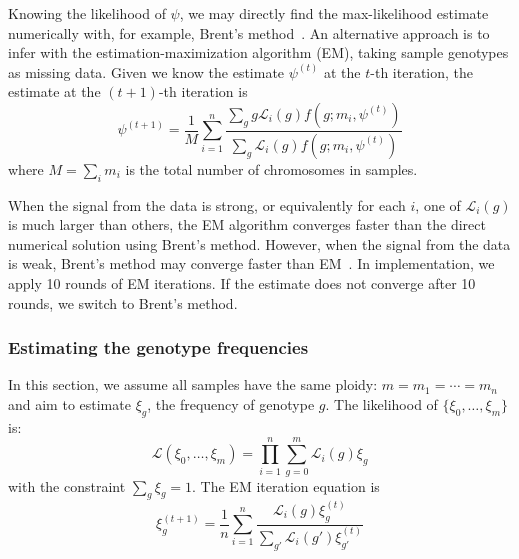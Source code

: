 \documentclass{bioinfo}
\begin{document}
\begin{methods}
Knowing the likelihood of $\psi$, we may directly find the max-likelihood
estimate numerically with, for example, Brent's method~\citep{Brent:1973kx}. An
alternative approach is to infer with the estimation-maximization algorithm
(EM), taking sample genotypes as missing data. Given we know the estimate
$\psi^{(t)}$ at the $t$-th iteration, the estimate at the $(t+1)$-th iteration
is
\begin{equation}\label{eq:saf-em}
\psi^{(t+1)}=\frac{1}{M}\sum_{i=1}^n\frac{\sum_{g}g\mathcal{L}_i(g)f(g;m_i,\psi^{(t)})}{\sum_{g}\mathcal{L}_i(g)f(g;m_i,\psi^{(t)})}
\end{equation}
where $M=\sum_im_i$ is the total number of chromosomes in samples.

When the signal from the data is strong, or equivalently for each $i$, one of
$\mathcal{L}_i(g)$ is much larger than others, the EM algorithm converges
faster than the direct numerical solution using Brent's method. However, when
the signal from the data is weak, Brent's method may converge faster than
EM~\citep{Kim:2011fk}. In implementation, we apply 10 rounds of EM iterations.
If the estimate does not converge after 10 rounds, we switch to Brent's method.

\subsubsection{Estimating the genotype frequencies}
In this section, we assume all samples have the same ploidy: $m=m_1=\cdots=m_n$
and aim to estimate $\xi_g$, the frequency of genotype $g$. The likelihood of
$\{\xi_0,\ldots,\xi_m\}$ is:
\begin{equation}
\mathcal{L}(\xi_0,\ldots,\xi_m)=\prod_{i=1}^n\sum_{g=0}^{m}\mathcal{L}_i(g)\xi_g
\end{equation}
with the constraint $\sum_g\xi_g=1$. The EM iteration equation is
\begin{equation}\label{eq:sgf-em}
\xi^{(t+1)}_g=\frac{1}{n}\sum_{i=1}^n\frac{\mathcal{L}_i(g)\xi^{(t)}_g}{\sum_{g'}\mathcal{L}_i(g')\xi_{g'}^{(t)}}
\end{equation}


\end{methods}
\end{document}
